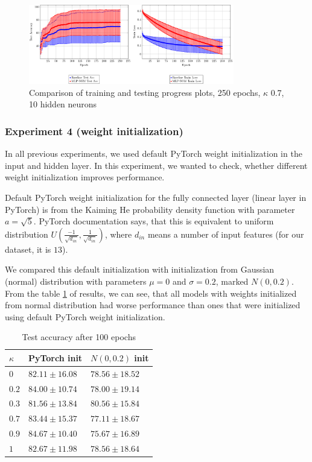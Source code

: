 \begin{figure}[h!]
    \centering
    \includegraphics[width=0.8\textwidth]{figs/baseline-model-tr-test-metrices-small-250ep.pdf}
    \caption{Comparison of training and testing progress plots, 250 epochs, $\kappa$ 0.7, 10 hidden neurons}
    \label{exp3-graphs}
\end{figure}


\newpage
\subsubsection{Experiment 4 (weight initialization)}

In all previous experiments, we used default PyTorch weight initialization in the input and hidden layer. In this experiment, we wanted to check, whether different weight initialization improves performance.

Default PyTorch weight initialization for the fully connected layer (linear layer in PyTorch) is from the Kaiming He probability density function with parameter $a = \sqrt{5}$. PyTorch documentation says, that this is equivalent to uniform distribution $U(\frac{-1}{\sqrt{d_{in}}}, \frac{1}{\sqrt{d_{in}}})$, where $d_{in}$ means a number of input features (for our dataset, it is $13$).

We compared this default initialization with initialization from Gaussian (normal) distribution with parameters $\mu = 0$ and $\sigma = 0.2$, marked $N(0, 0.2)$. From the table \ref{exp4-res-table} of results, we can see, that all models with weights initialized from normal distribution had worse performance than ones that were initialized using default PyTorch weight initialization. 


\begin{table}[h!]
\centering
\begin{tabular}{|l|l|l|}
\hline
$\kappa$        & PyTorch init & $N(0, 0.2)$ init \\ \hline
$0$   &  $82.11	\pm 16.08$ &  $78.56	\pm 18.52$ \\ \hline
$0.2$ &  $84.00	\pm 10.74$ &  $78.00	\pm 19.14$  \\ \hline
$0.3$ &  $81.56	\pm 13.84$ & \color{purple} $80.56	\pm 15.84$  \\ \hline
$0.7$ &  $83.44	\pm 15.37$ &  $77.11	\pm 18.67$  \\ \hline
$0.9$ &  \color{purple} $84.67	\pm 10.40$ &  $75.67	\pm 16.89$  \\ \hline
$1$   &  $82.67	\pm 11.98$ &  $78.56	\pm 18.64$   \\ \hline

\end{tabular}
\caption{Test accuracy after 100 epochs}
\label{exp4-res-table}
\end{table}


